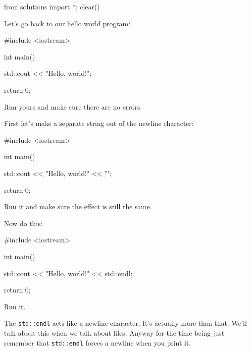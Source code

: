 \begin{python0}
from solutions import *; clear()
\end{python0}

Let's go back to our hello world program:
\begin{console}
#include <iostream>

int main()
{
    std::cout << "Hello, world!\n";

    return 0;
}
\end{console}
Run yours and make sure there are no errors.

First let's make a separate string out of the newline character:
\begin{console}
#include <iostream>

int main()
{
    std::cout << "Hello, world!" << "\n";

    return 0;
}
\end{console}
Run it and make sure the effect is still the same.

Now do this:
\begin{console}
#include <iostream>

int main()
{
    std::cout << "Hello, world!" << std::endl;

    return 0;
}
\end{console}
Run it.

The \verb!std::endl! acts like a newline character. 
It's actually more than that. 
We'll talk about this when we talk about files. 
Anyway for the time being just remember that 
\verb!std::endl! forces a newline when you print it.



